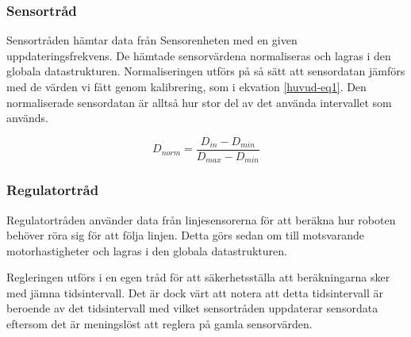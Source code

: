 \subsubsection{Sensortråd}
Sensortråden hämtar data från Sensorenheten med en given uppdateringsfrekvens. De hämtade sensorvärdena normaliseras och lagras i den globala datastrukturen. Normaliseringen utförs på så sätt att sensordatan jämförs med de värden vi fått genom kalibrering, som i ekvation \ref{huvud-eq1}. Den normaliserade sensordatan är alltså hur stor del av det använda intervallet som används.

\begin{equation} \label{huvud-eq1}
	D_{norm}=\frac{D_{in}-D_{min}}{D_{max}-D_{min}}
\end{equation}

\subsubsection{Regulatortråd}
Regulatortråden använder data från linjesensorerna för att beräkna hur roboten behöver röra sig för att följa linjen. Detta görs sedan om till motsvarande motorhastigheter och lagras i den globala datastrukturen.

Regleringen utförs i en egen tråd för att säkerhetsställa att beräkningarna sker med jämna tidsintervall. Det är dock värt att notera att detta tidsintervall är beroende av det tidsintervall med vilket sensortråden uppdaterar sensordata eftersom det är meningslöst att reglera på gamla sensorvärden.
